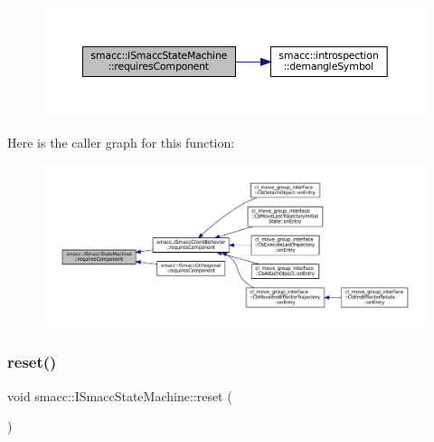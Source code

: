 \nopagebreak
\begin{figure}[H]
\begin{center}
\leavevmode
\includegraphics[width=350pt]{classsmacc_1_1ISmaccStateMachine_aa6b25e28f3bce24c4b356dc865a9eb7b_cgraph}
\end{center}
\end{figure}
Here is the caller graph for this function\+:
\nopagebreak
\begin{figure}[H]
\begin{center}
\leavevmode
\includegraphics[width=350pt]{classsmacc_1_1ISmaccStateMachine_aa6b25e28f3bce24c4b356dc865a9eb7b_icgraph}
\end{center}
\end{figure}
\mbox{\label{classsmacc_1_1ISmaccStateMachine_a9e4b4fe4dda962642397993235c6eea0}} 
\subsubsection{\texorpdfstring{reset()}{reset()}}
{\footnotesize\ttfamily void smacc\+::\+I\+Smacc\+State\+Machine\+::reset (\begin{DoxyParamCaption}{ }\end{DoxyParamCaption})\hspace{0.3cm}{\ttfamily [virtual]}}



